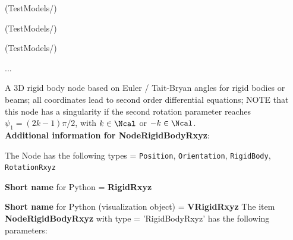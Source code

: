 \item {} (TestModels/)
\item {} (TestModels/)
\item {} (TestModels/)
\item  ...

\ei

%
\newpage

\label{sec:item:NodeRigidBodyRxyz}
A 3D rigid body node based on Euler / Tait-Bryan angles for rigid bodies or beams; all coordinates lead to second order differential equations; NOTE that this node has a singularity if the second rotation parameter reaches $\psi_1 = (2k-1) \pi/2$, with $k \in \Ncal$ or $-k \in \Ncal$.\vspace{12pt}
 \\{\bf Additional information for NodeRigidBodyRxyz}:
\bi
  \item The Node has the following types = \texttt{Position}, \texttt{Orientation}, \texttt{RigidBody}, \texttt{RotationRxyz}
  \item {\bf Short name} for Python = {\bf RigidRxyz}  \item {\bf Short name} for Python (visualization object) = {\bf VRigidRxyz}\ei
\vspace{12pt} \noindent The item {\bf NodeRigidBodyRxyz} with type = 'RigidBodyRxyz' has the following parameters:\vspace{-1cm}\\ 
